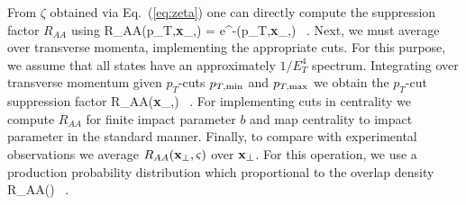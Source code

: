 From $\zeta$ obtained via Eq.~(\ref{eq:zeta}) one can directly compute the suppression factor $R_{AA}$ using
%
\be
R_{AA}(p_T,{\bf x}_\perp,\varsigma) = e^{-\zeta(p_T,{\bf x}_\perp,\varsigma)} \, .
\ee
%
Next, we must average over transverse momenta, implementing the appropriate cuts.
For this purpose, we assume that 
all states have an approximately $1/E_T^4$ spectrum.  Integrating over transverse momentum given $p_T$-cuts $p_{T,\rm min}$ and
$p_{T,\rm max}$ we obtain the $p_T$-cut suppression factor
%
\be
R_{AA}({\bf x}_\perp,\varsigma) \equiv {} \, .
\ee
%
For implementing cuts in centrality we compute $R_{AA}$ for finite impact parameter $b$ and map centrality
to impact parameter in the standard manner. Finally, to compare with experimental observations we average $R_{AA}({\bf x}_\perp,\varsigma)$
over ${\bf x}_\perp$.  For this operation, we use a production probability distribution which proportional to the overlap density~\cite{Strickland:2011aa}
%
\be
\langle R_{AA}(\varsigma) \rangle \equiv 
{} \, .
\label{eq:geoaverage}
\ee
